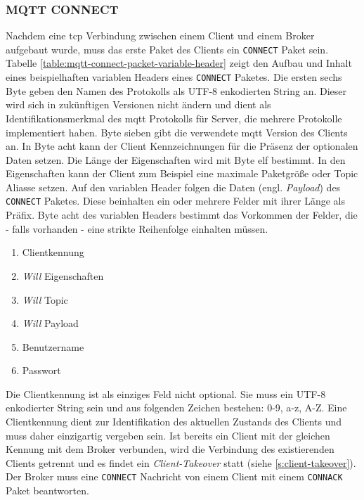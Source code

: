 \subsubsection{MQTT CONNECT} \label{s:mqtt-connect}
Nachdem eine \ac{tcp} Verbindung zwischen einem Client und einem Broker aufgebaut wurde, muss das erste Paket des Clients ein \verb|CONNECT| Paket sein.
Tabelle \ref{table:mqtt-connect-packet-variable-header} zeigt den Aufbau und Inhalt eines beispielhaften variablen Headers eines \verb|CONNECT| Paketes.
Die ersten sechs Byte geben den Namen des Protokolls als UTF-8 enkodierten String an. Dieser wird sich in zukünftigen Versionen nicht ändern und dient als Identifikationsmerkmal des \ac{mqtt} Protokolls für Server, die mehrere Protokolle implementiert haben. Byte sieben gibt die verwendete \ac{mqtt} Version des Clients an. In Byte acht kann der Client Kennzeichnungen für die Präsenz der optionalen Daten setzen. Die Länge der Eigenschaften wird mit Byte elf bestimmt. In den Eigenschaften kann der Client zum Beispiel eine maximale Paketgrö{\ss}e oder Topic Aliasse setzen.\cite{mqtt5Specification}
\newpage\noindent
Auf den variablen Header folgen die Daten (engl. \textit{Payload}) des \verb|CONNECT| Paketes. Diese beinhalten ein oder mehrere Felder mit ihrer Länge als Präfix. Byte acht des variablen Headers bestimmt das Vorkommen der Felder, die - falls vorhanden - eine strikte Reihenfolge einhalten müssen.
\cite{mqtt5Specification}
\begin{enumerate}
    \item Clientkennung
    \item \textit{Will} Eigenschaften
    \item \textit{Will} Topic
    \item \textit{Will} Payload
    \item Benutzername
    \item Passwort
\end{enumerate}
Die Clientkennung ist als einziges Feld nicht optional. Sie muss ein UTF-8 enkodierter String sein und aus folgenden Zeichen bestehen: 0-9, a-z, A-Z.
Eine Clientkennung dient zur Identifikation des aktuellen Zustands des Clients und muss daher einzigartig vergeben sein. Ist bereits ein Client mit der gleichen Kennung mit dem Broker verbunden, wird die Verbindung des existierenden Clients getrennt und es findet ein \textit{Client-Takeover} statt (siehe \ref{s:client-takeover}).
Der Broker muss eine \verb|CONNECT| Nachricht von einem Client mit einem \verb|CONNACK| Paket beantworten.
\cite{mqtt5Specification}
